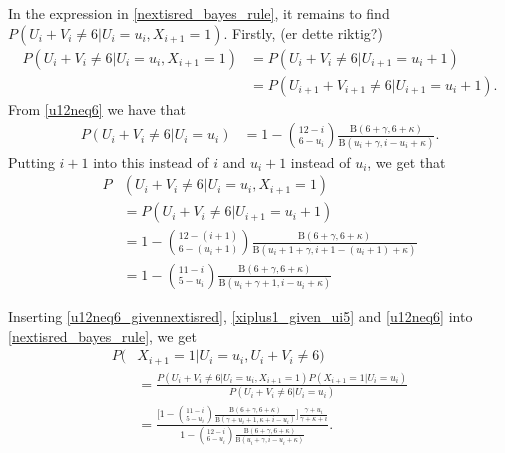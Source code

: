 In the expression in \eqref{nextisred_bayes_rule}, it remains to find $P(U_i+V_i\neq6|U_i=u_i,X_{i+1}=1)$.
Firstly, (er dette riktig?)
\begin{equation*}
    \begin{aligned}
        P(U_i+V_i\neq6|U_i=u_i,X_{i+1}=1) 
        &= P(U_i+V_i\neq6|U_{i+1}=u_i+1)\\[6pt]
        &= P(U_{i+1}+V_{i+1}\neq6|U_{i+1}=u_i+1).
    \end{aligned}
\end{equation*}
From \eqref{u12neq6} we have that
\begin{equation}
    \begin{aligned}
        P(U_i+V_i\neq6|U_i=u_i) 
        &= 1-\binom{12-i}{6-u_i} \frac{\text{B}(6+\gamma,6+\kappa)}{\text{B}(u_i+\gamma,i-u_i+\kappa)}.
    \end{aligned}
\end{equation}
Putting $i+1$ into this instead of $i$ and $u_i+1$ instead of $u_i$, we get that
\begin{equation}
\label{u12neq6_givennextisred}
    \begin{aligned}
        P&(U_i+V_i\neq6|U_i=u_i,X_{i+1}=1)\\[6pt] 
        &= P(U_i+V_i\neq6|U_{i+1}=u_i+1)\\[6pt]
        &= 1-\binom{12-(i+1)}{6-(u_i+1)} \frac{\text{B}(6+\gamma,6+\kappa)}{\text{B}(u_i+1+\gamma,i+1-(u_i+1)+\kappa)}\\[6pt]
        &= 1-\binom{11-i}{5-u_i} \frac{\text{B}(6+\gamma,6+\kappa)}{\text{B}(u_i+\gamma+1,i-u_i+\kappa)}
    \end{aligned}
\end{equation}

Inserting \eqref{u12neq6_givennextisred}, \eqref{xiplus1_given_ui5} and \eqref{u12neq6} into \eqref{nextisred_bayes_rule}, we get
\begin{equation}
\label{nextisred_given_majority}
    \begin{aligned}
        P(&X_{i+1}=1|U_i=u_i,U_i+V_i\neq6) \\[6pt]
        &= \frac{P(U_i+V_i\neq6|U_i=u_i,X_{i+1}=1)P(X_{i+1}=1|U_i=u_i)}
        {P(U_i+V_i\neq6|U_i=u_i)}\\[6pt]
        &= \frac{\bigg[ 1 - \binom{11-i}{5-u_i}\frac{\text{B}(6+\gamma,6+\kappa)}{\text{B}(\gamma+u_i+1,\kappa+i-u_i)} \bigg]
        \frac{\gamma+u_i}
        {\gamma+\kappa+i}}
        {1-\binom{12-i}{6-u_i} \frac{\text{B}(6+\gamma,6+\kappa)}{\text{B}(u_i+\gamma,i-u_i+\kappa)}}.
    \end{aligned}
\end{equation}


